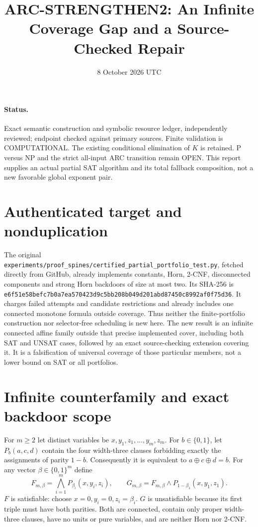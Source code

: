 \documentclass[11pt]{article}
\title{ARC-STRENGTHEN2: An Infinite Coverage Gap and a Source-Checked Repair}
\date{8 October 2026 UTC}
\begin{document}
\maketitle
\paragraph{Status.} Exact semantic construction and symbolic resource ledger, independently reviewed; endpoint checked against primary sources. Finite validation is COMPUTATIONAL. The existing conditional elimination of $K$ is retained. P versus NP and the strict all-input ARC transition remain OPEN. This report supplies an actual partial SAT algorithm and its total fallback composition, not a new favorable global exponent pair.

\section{Authenticated target and nonduplication}
The original \nolinkurl{experiments/proof_spines/certified_partial_portfolio_test.py}, fetched directly from GitHub, already implements constants, Horn, 2-CNF, disconnected components and strong Horn backdoors of size at most two. Its SHA-256 is
\nolinkurl{e6f51e58befc7b0a7ea570423d9c5bb208b049d201abd87450c8992af0f75d36}.
It charges failed attempts and candidate restrictions and already includes one connected monotone formula outside coverage. Thus neither the finite-portfolio construction nor selector-free scheduling is new here. The new result is an infinite connected affine family outside that precise implemented cover, including both SAT and UNSAT cases, followed by an exact source-checking extension covering it. It is a falsification of universal coverage of those particular members, not a lower bound on SAT or all portfolios.

\section{Infinite counterfamily and exact backdoor scope}
For $m\ge2$ let distinct variables be $x,y_1,z_1,\ldots,y_m,z_m$.
For $b\in\{0,1\}$, let $P_b(a,c,d)$ contain the four width-three clauses forbidding exactly the assignments of parity $1-b$. Consequently it is equivalent to $a\oplus c\oplus d=b$.
For any vector $\beta\in\{0,1\}^m$ define
\[
 F_{m,\beta}=\bigwedge_{i=1}^m P_{\beta_i}(x,y_i,z_i),\qquad
 G_{m,\beta}=F_{m,\beta}\wedge P_{1-\beta_1}(x,y_1,z_1).
\]
$F$ is satisfiable: choose $x=0,y_i=0,z_i=\beta_i$.
$G$ is unsatisfiable because its first triple must have both parities.
Both are connected, contain only proper width-three clauses, have no units or pure variables, and are neither Horn nor 2-CNF.
\end{document}
